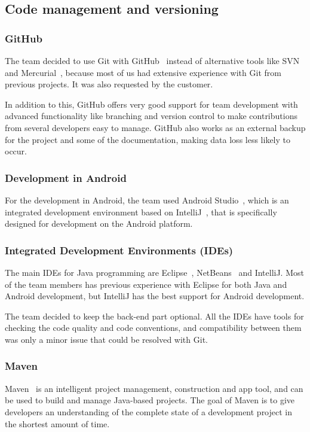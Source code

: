 \subsection{Code management and versioning}
\subsubsection{GitHub}
The team decided to use Git with GitHub~\cite{github} instead of alternative tools like SVN~\cite{svn} and Mercurial~\cite{mercurial}, because most of us had extensive experience with Git from previous projects. It was also requested by the customer. 

In addition to this, GitHub offers very good support for team development with advanced functionality like branching and version control to make contributions from several developers easy to manage. GitHub also works as an external backup for the project and some of the documentation, making data loss less likely to occur.

\subsubsection{Development in Android}
For the development in Android, the team used Android Studio~\cite{Android-studio}, which is an integrated development environment based on IntelliJ~\cite{intellij}, that is specifically designed for development on the Android platform.

\subsubsection{Integrated Development Environments (IDEs)}
The main IDEs for Java programming are Eclipse~\cite{eclipse}, NetBeans~\cite{netbeans} and IntelliJ. Most of the team members has previous experience with Eclipse for both Java and Android development, but IntelliJ has the best support for Android development.

The team decided to keep the back-end part optional. All the IDEs have tools for checking the code quality and code conventions, and compatibility between them was only a minor issue that could be resolved with Git.

\subsubsection{Maven}
Maven~\cite{maven} is an intelligent project management, construction and app tool, and can be used to build and manage Java-based projects. The goal of Maven is to give developers an understanding of the complete state of a development project in the shortest amount of time.

